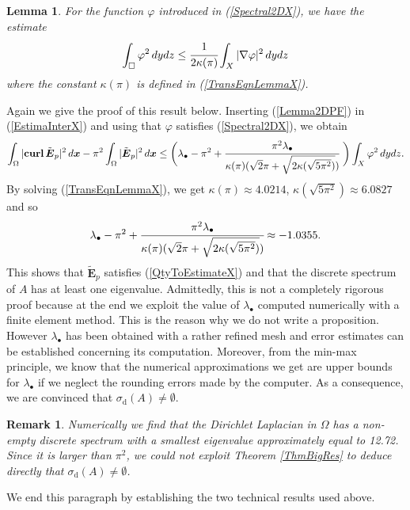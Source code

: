 \documentclass[11pt,a4paper]{article}
\newcommand{\dsp}{\displaystyle}
\newcommand{\Om}{\Omega}
\newcommand{\mrm}[1]{\mathrm{#1}}
\newcommand{\bfx}{\boldsymbol{x}}
\newcommand{\curlvec}{\boldsymbol{\mrm{curl}}\,}
\newcommand{\GX}{X}
\def\E{\boldsymbol{E}}
\newtheorem{lemma}[theorem]{Lemma}
\newtheorem{remark}[theorem]{Remark}
\begin{document}
\begin{lemma}\label{LemmaProof6Legs2}
For the function $\varphi$ introduced in (\ref{Spectral2DX}), we have the estimate
\begin{equation}\label{Lemma2DPF}
\dsp\int_{\square}\varphi^2\,dydz \le \cfrac{1}{2\kappa(\pi)}\int_{\GX}|\nabla\varphi|^2\,dydz
\end{equation}
where the constant $\kappa(\pi)$ is defined in (\ref{TransEqnLemmaX}).
\end{lemma}
\noindent Again we give the proof of this result below. Inserting (\ref{Lemma2DPF}) in (\ref{EstimaInterX}) and using that $\varphi$ satisfies (\ref{Spectral2DX}), we obtain 
\[
\dsp\int_{\Om} |\curlvec\tilde{\E}_{p}|^2\,d\bfx-\pi^2\int_{\Om} |\tilde{\E}_{p}|^2\,d\bfx \le  \bigg(\lambda_\bullet-\pi^2+\cfrac{\pi^2\lambda_\bullet}{\kappa(\pi)(\sqrt{2}\pi+\sqrt{2\kappa(\sqrt{5\pi^2})})}\ \bigg)\dsp\int_\GX\varphi^2\,dydz.
\]
By solving (\ref{TransEqnLemmaX}), we get $\kappa(\pi)\approx4.0214$, $\kappa(\sqrt{5\pi^2})\approx6.0827$ and so
\[
\lambda_\bullet-\pi^2+\cfrac{\pi^2\lambda_\bullet}{\kappa(\pi)(\sqrt{2}\pi+\sqrt{2\kappa(\sqrt{5\pi^2})})} \approx -1.0355.
\]
This shows that $\tilde{\E}_{p}$ satisfies (\ref{QtyToEstimateX}) and that the discrete spectrum of $A$ has at least one eigenvalue.  Admittedly, this is not a completely rigorous proof because at the end we exploit the value of $\lambda_\bullet$ computed numerically with a finite element method. This is the reason why we do not write a proposition. However $\lambda_\bullet$ has been obtained with a rather refined mesh and error estimates can be established concerning its computation. Moreover, from the min-max principle, we know that the numerical approximations we get are upper bounds for $\lambda_\bullet$ if we neglect the rounding errors made by the computer. As a consequence, we are convinced that $\sigma_{\mrm{d}}(A)\ne\emptyset$.
\begin{remark}\label{RmkAppThm}
Numerically we find that the Dirichlet Laplacian in $\Om$ has 
a non-empty discrete spectrum with a smallest eigenvalue approximately equal to 12.72. Since it is larger than $\pi^2$, we could not exploit Theorem \ref{ThmBigRes} to deduce directly that $\sigma_{\mrm{d}}(A)\ne\emptyset$.
\end{remark}
\noindent We end this paragraph by establishing the two technical results used above. \\
 
\end{document}
